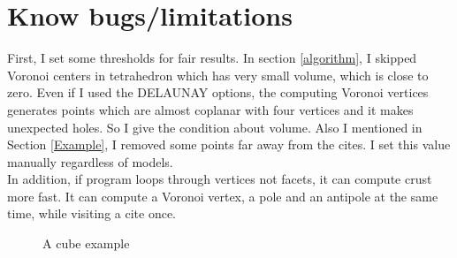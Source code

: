 \documentclass[11pt]{article}
\begin{document}
\section{Know bugs/limitations}
First, I set some thresholds for fair results. In section \ref{algorithm}, I skipped Voronoi centers in tetrahedron which has very small volume, which is close to zero. Even if I used the DELAUNAY options, the computing Voronoi vertices generates points which are almost coplanar with four vertices and it makes unexpected holes. So I give the condition about volume. Also I mentioned in Section \ref{Example}, I removed some points far away from the cites. I set this value manually regardless of models. \\
In addition, if program loops through vertices not facets, it can compute crust more fast. It can compute a Voronoi vertex, a pole and an antipole at the same time, while visiting a cite once. 


\begin{figure}[hbt]
 \centering
  \hspace{-3mm}
  \hspace{-3mm}
    \caption{A cube example\label{fig:cube}}
\end{figure}
\end{document}
